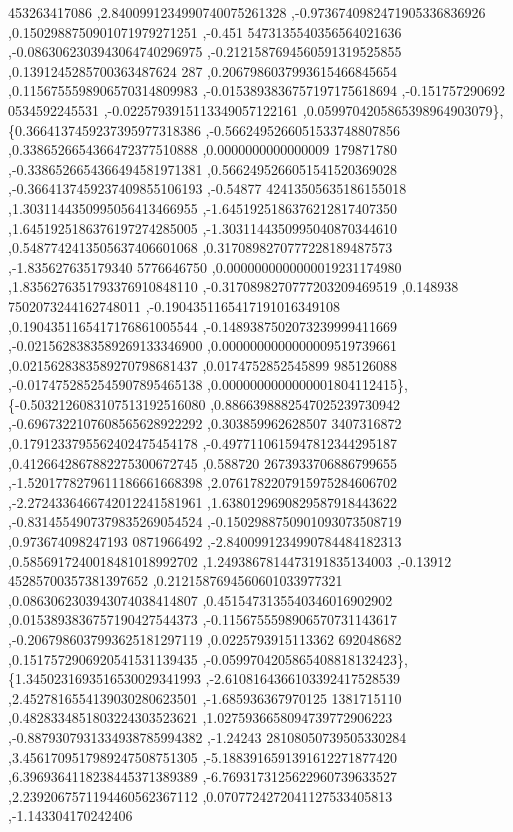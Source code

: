 \begin{DoxyCode}
      453263417086 ,2.8400991234990740075261328 ,-0.9736740982471905336836926 ,0.1502988750901071979271251 ,-0.451
      5473135540356564021636 ,-0.0863062303943064740296975 ,-0.2121587694560591319525855 ,0.1391245285700363487624
      287 ,0.2067986037993615466845654 ,0.1156755598906570314809983 ,-0.0153893836757197175618694 ,-0.151757290692
      0534592245531 ,-0.0225793915113349057122161 ,0.0599704205865398964903079\},
\{0.3664137459237395977318386 ,-0.5662495266051533748807856 ,0.3386526654366472377510888 ,0.0000000000000009
      179871780 ,-0.3386526654366494581971381 ,0.5662495266051541520369028 ,-0.3664137459237409855106193 ,-0.54877
      42413505635186155018 ,1.3031144350995056413466955 ,-1.6451925186376212817407350 ,1.6451925186376197274285005
       ,-1.3031144350995040870344610 ,0.5487742413505637406601068 ,0.3170898270777228189487573 ,-1.835627635179340
      5776646750 ,0.0000000000000019231174980 ,1.8356276351793376910848110 ,-0.3170898270777203209469519 ,0.148938
      7502073244162748011 ,-0.1904351165417191016349108 ,0.1904351165417176861005544 ,-0.1489387502073239999411669
       ,-0.0215628383589269133346900 ,0.0000000000000009519739661 ,0.0215628383589270798681437 ,0.0174752852545899
      985126088 ,-0.0174752852545907895465138 ,0.0000000000000001804112415\},
\{-0.5032126083107513192516080 ,0.8866398882547025239730942 ,-0.6967322107608565628922292 ,0.303859962628507
      3407316872 ,0.1791233795562402475454178 ,-0.4977110615947812344295187 ,0.4126642867882275300672745 ,0.588720
      2673933706886799655 ,-1.5201778279611186661668398 ,2.0761782207915975284606702 ,-2.2724336466742012241581961
       ,1.6380129690829587918443622 ,-0.8314554907379835269054524 ,-0.1502988750901093073508719 ,0.973674098247193
      0871966492 ,-2.8400991234990784484182313 ,0.5856917240018481018992702 ,1.2493867814473191835134003 ,-0.13912
      45285700357381397652 ,0.2121587694560601033977321 ,0.0863062303943074038414807 ,0.4515473135540346016902902 
      ,0.0153893836757190427544373 ,-0.1156755598906570731143617 ,-0.2067986037993625181297119 ,0.0225793915113362
      692048682 ,0.1517572906920541531139435 ,-0.0599704205865408818132423\},
\{1.3450231693516530029341993 ,-2.6108164366103392417528539 ,2.4527816554139030280623501 ,-1.685936367970125
      1381715110 ,0.4828334851803224303523621 ,1.0275936658094739772906223 ,-0.8879307931334938785994382 ,-1.24243
      28108050739505330284 ,3.4561709517989247508751305 ,-5.1883916591391612271877420 ,6.3969364118238445371389389
       ,-6.7693173125622960739633527 ,2.2392067571194460562367112 ,0.0707724272041127533405813 ,-1.143304170242406

\end{DoxyCode}
